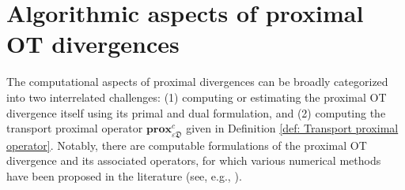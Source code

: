 \documentclass{amsart}
\newcommand{\BZ}[1]{\textcolor{olive}{BZ: #1}}
\newcommand{\PB}[1]{\textcolor{magenta}{PB: #1}}
\theoremstyle{definition}
\theoremstyle{remark}
\numberwithin{equation}{section}
\DeclareMathOperator*{\argmax}{argmax}
\begin{document}




\section{Algorithmic aspects of proximal OT divergences}
\label{sec:algorithms}

The computational aspects of proximal divergences can be broadly categorized into two interrelated challenges: (1) computing or estimating the proximal OT divergence itself using its primal and dual formulation, and (2) computing the transport proximal operator $\textbf{prox}^c_{\varepsilon \mathfrak{D}}$ given in Definition \ref{def:  Transport proximal operator}. Notably, there are computable formulations of the proximal OT divergence and its associated operators, for which various numerical methods have been proposed in the literature (see, e.g., \cite{onken2021ot,NEURALODE}).
\end{document}
